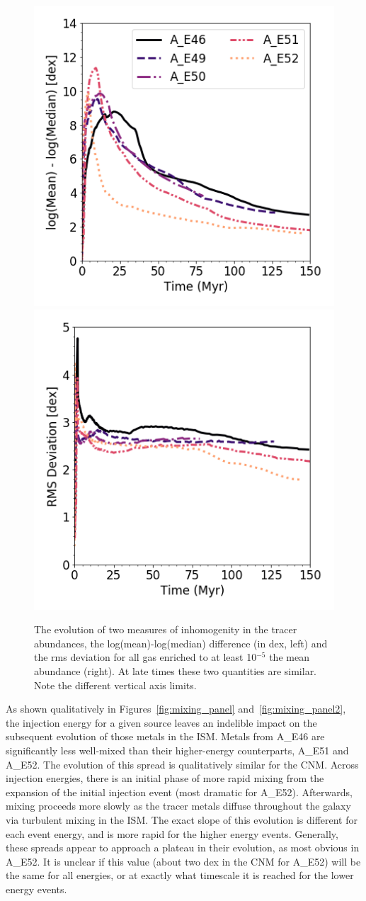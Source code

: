 \documentclass[twocolumn]{aastex62}
\newcommand{\runone}{A\_}
\begin{document}
\begin{figure}
  \centering
\includegraphics[width=0.475\linewidth]{CNM_average_mean-median}
\includegraphics[width=0.475\linewidth]{CNM_average_rms}
\caption{The evolution of two measures of inhomogenity in the tracer abundances, the log(mean)-log(median) difference (in dex, left) and the rms deviation for all gas enriched to at least 10$^{-5}$ the mean abundance (right). At late times these two quantities are similar. Note the different vertical axis limits.}
  \label{fig:mean-median}
\end{figure}


As shown qualitatively in Figures~\ref{fig:mixing_panel} and~\ref{fig:mixing_panel2}, the injection energy for a given source leaves an indelible impact on the subsequent evolution of those metals in the ISM. Metals from \runone E46 are significantly less well-mixed than their higher-energy counterparts, \runone E51 and \runone E52. The evolution of this spread is qualitatively similar for the CNM. Across injection energies, there is an initial phase of more rapid mixing from the expansion of the initial injection event (most dramatic for \runone E52). Afterwards, mixing proceeds more slowly as the tracer metals diffuse throughout the galaxy via turbulent mixing in the ISM. The exact slope of this evolution is different for each event energy, and is more rapid for the higher energy events. Generally, these spreads appear to approach a plateau in their evolution, as most obvious in \runone E52. It is unclear if this value (about two dex in the CNM for \runone E52) will be the same for all energies, or at exactly what timescale it is reached for the lower energy events. 
\end{document}
